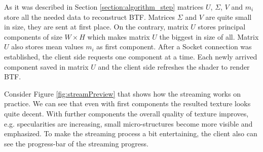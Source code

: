 As it was described in Section \ref{section:algorithm_step} matrices $U$, $\Sigma$, $V$ and $m_{i}$ store all the needed data to reconstruct BTF.
Matrices $\Sigma$ and $V$ are quite small in size, they are sent at first place. On the contrary, matrix $U$ stores principal components of size $W \times H$ which makes matrix $U$ the biggest in size of all.
Matrix $U$ also stores mean values $m_{i}$ as first component.
After a Socket connection was established, the client side requests one component at a time. 
Each newly arrived component saved in matrix $U$ and the client side refreshes the shader to render BTF.



Consider Figure \ref{fig:streamPreview} that shows how the streaming works on practice.
We can see that even with first components the resulted texture looks quite decent.
With further components the overall quality of texture improves, e.g. specularities are increasing, small micro-structures become more visible and emphasized.
To make the streaming process a bit entertaining, the client also can see the progress-bar of the streaming progress.









